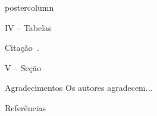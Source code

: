 \documentclass[final,hyperref={pdfpagelabels=false}]{beamer}
\begin{document}
\begin{frame}
\begin{columns}
\begin{column}{.54\textwidth}
\begin{beamercolorbox}[center,wd=\textwidth]{postercolumn}
\begin{minipage}[T]{.95\textwidth}
{\begin{block}{\vspace{-6pt} \large IV -- Tabelas}
							\vspace*{14pt}
							
							\begin{itemize}
								
								{\small \item Citação~\cite{jia2014caffe}.}
								
							\end{itemize}
							
							
						\end{block}
						
						\vspace*{8pt}
						
						\begin{block}{\vspace{-6pt} \large V -- Seção}
						\end{block}
						
						\vspace*{8pt}
						
						\begin{block}{\vspace{-6pt} \large Agradecimentos}
							{\small Os autores agradecem...}
						\end{block}	
						
						\vspace*{8pt}
						
						\begin{block}{\vspace{-6pt} \large Referências}
							{\tiny
								
								}
						\end{block}
						
						\vspace*{8pt}
						
						
						
					}
				\end{minipage}
			\end{beamercolorbox}
		\end{column}
	\end{columns}
\end{frame}
\end{document}
